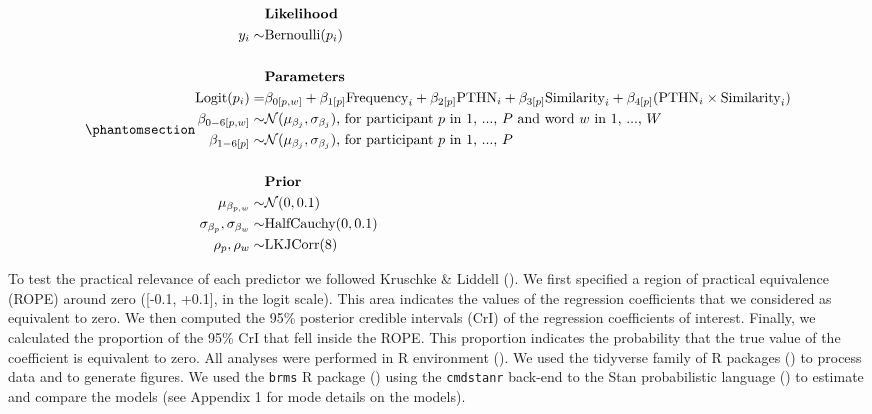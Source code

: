 \documentclass[
]{article}
\begin{document}
\begin{equation}\phantomsection\label{eq-1}{
\begin{aligned}
&\textbf{Likelihood}  \\
y_{i} \sim & \text{Bernoulli}(p_{i}) \\ \\
&\textbf{Parameters}  \\
\text{Logit}(p_{i}) = &  \beta_{0[p,w]} + \beta_{1[p]} \text{Frequency}_{i} + \beta_{2[p]} \text{PTHN}_i + \beta_{3[p]} \text{Similarity}_i + \beta_{4[p]} (\text{PTHN}_i \times \text{Similarity}_i) \\
\beta_{0-6[p,w]} \sim & \mathcal{N}(\mu_{\beta_{j}}, \sigma_{\beta_{j}}) \text{, for participant } p \text{ in 1, ..., } P \text{ and  word } w \text{ in 1, ..., } W \\
\beta_{1-6[p]} \sim &  \mathcal{N}(\mu_{\beta_{j}}, \sigma_{\beta_{j}}) \text{, for participant } p \text{ in 1, ..., } P \\ \\
&\textbf{Prior}  \\
\mu_{\beta_{p,w}}  \sim &  \mathcal{N}(0, 0.1) \\
\sigma_{\beta_{p}},  \sigma_{\beta_{w}} \sim & \text{HalfCauchy}(0, 0.1) \\
\rho_{p}, \rho_{w} \sim & \text{LKJCorr}(8) \\
\end{aligned}
}\end{equation}

To test the practical relevance of each predictor we followed Kruschke
\& Liddell (). We first
specified a region of practical equivalence (ROPE) around zero ({[}-0.1,
+0.1{]}, in the logit scale). This area indicates the values of the
regression coefficients that we considered as equivalent to zero. We
then computed the 95\% posterior credible intervals (CrI) of the
regression coefficients of interest. Finally, we calculated the
proportion of the 95\% CrI that fell inside the ROPE. This proportion
indicates the probability that the true value of the coefficient is
equivalent to zero. All analyses were performed in R environment
(). We used the
tidyverse family of R packages
() to process
data and to generate figures. We used the \texttt{brms} R package
() using the
\texttt{cmdstanr} back-end to the Stan probabilistic language
() to estimate
and compare the models (see Appendix 1 for mode details on the models).
\end{document}
